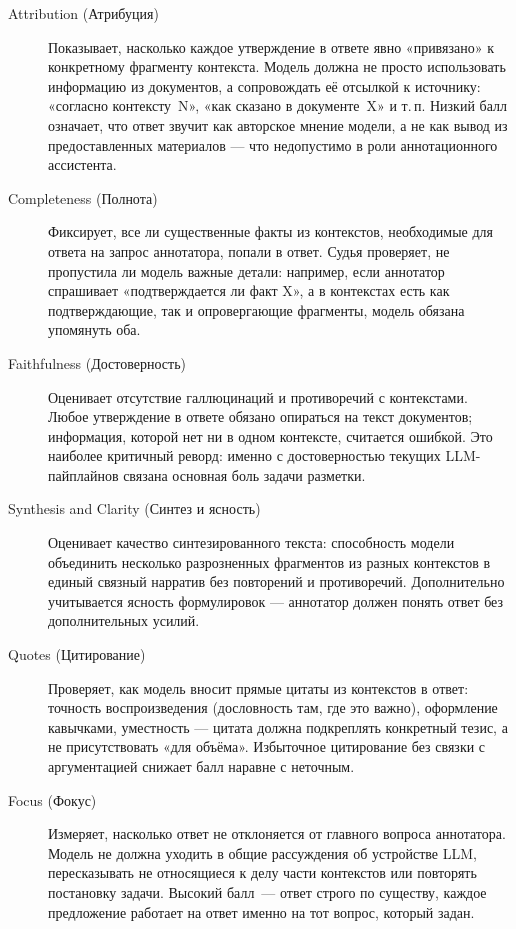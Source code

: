\documentclass[times]{itmo-student-thesis}
\begin{document}
\begin{description}
    \item[Attribution (Атрибуция)] Показывает, насколько каждое утверждение
    в ответе явно «привязано» к конкретному фрагменту контекста.
    Модель должна не просто использовать информацию из документов, а
    сопровождать её отсылкой к источнику: «согласно контексту~N», «как
    сказано в документе~X» и т.\,п. Низкий балл означает, что ответ
    звучит как авторское мнение модели, а не как вывод из предоставленных
    материалов — что недопустимо в роли аннотационного ассистента.

    \item[Completeness (Полнота)] Фиксирует, все ли существенные факты
    из контекстов, необходимые для ответа на запрос аннотатора, попали
    в ответ. Судья проверяет, не пропустила ли модель важные детали:
    например, если аннотатор спрашивает «подтверждается ли факт X»,
    а в контекстах есть как подтверждающие, так и опровергающие фрагменты,
    модель обязана упомянуть оба.

    \item[Faithfulness (Достоверность)] Оценивает отсутствие галлюцинаций
    и противоречий с контекстами. Любое утверждение в ответе обязано
    опираться на текст документов; информация, которой нет ни в одном
    контексте, считается ошибкой. Это наиболее критичный реворд:
    именно с достоверностью текущих LLM-пайплайнов связана основная
    боль задачи разметки.

    \item[Synthesis and Clarity (Синтез и ясность)] Оценивает качество
    синтезированного текста: способность модели объединить несколько
    разрозненных фрагментов из разных контекстов в единый связный нарратив
    без повторений и противоречий. Дополнительно учитывается ясность
    формулировок — аннотатор должен понять ответ без дополнительных
    усилий.

    \item[Quotes (Цитирование)] Проверяет, как модель вносит прямые цитаты
    из контекстов в ответ: точность воспроизведения (дословность там,
    где это важно), оформление кавычками, уместность — цитата должна
    подкреплять конкретный тезис, а не присутствовать «для объёма».
    Избыточное цитирование без связки с аргументацией снижает балл
    наравне с неточным.

    \item[Focus (Фокус)] Измеряет, насколько ответ не отклоняется от
    главного вопроса аннотатора. Модель не должна уходить в общие
    рассуждения об устройстве LLM, пересказывать не относящиеся к делу
    части контекстов или повторять постановку задачи. Высокий балл~---
    ответ строго по существу, каждое предложение работает на ответ
    именно на тот вопрос, который задан.
\end{description}
\end{document}
